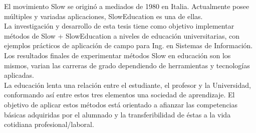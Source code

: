 % 
% 
%
El movimiento Slow se origin\'o a mediados de 1980 en Italia. Actualmente posee m\'ultiples y variadas aplicaciones, SlowEducation es una de ellas.\\
La investigaci\'on y desarrollo de esta tesis tiene como objetivo implementar m\'etodos de Slow + SlowEducation a niveles de educaci\'on universitarias, 
con ejemplos pr\'acticos de aplicaci\'on de campo para Ing. en Sistemas de Informaci\'on.\\
Los resultados finales de experimentar m\'etodos Slow en educaci\'on son los mismos, varian las carreras de grado dependiendo de herramientas 
y tecnolog\'ias aplicadas.\\
La educaci\'on lenta una relaci\'on entre el estudiante, el profesor y la Universidad, conformando as\'i entre estos tres elementos una sociedad de 
aprendizaje. El objetivo de aplicar estos m\'etodos est\'a orientado a afianzar las competencias b\'asicas adquiridas por el alumnado y la transferibilidad 
de \'estas a la vida cotidiana profesional/laboral.


